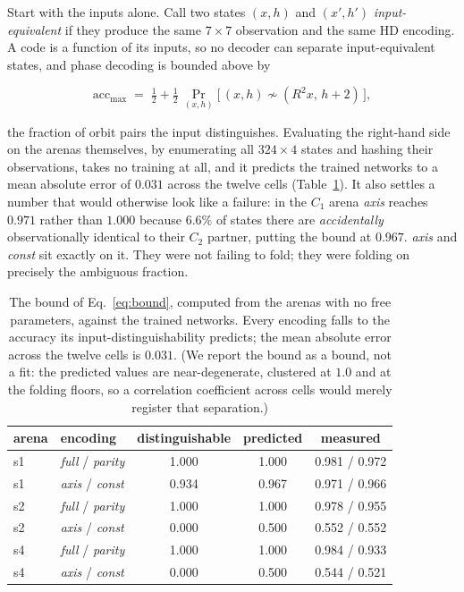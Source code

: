 Start with the inputs alone. Call two states $(x,h)$ and $(x',h')$ \emph{input-equivalent} if they
produce the same $7\times7$ observation and the same HD encoding. A code is a function of its inputs, so
no decoder can separate input-equivalent states, and phase decoding is bounded above by

\begin{equation}
\mathrm{acc}_{\max} \;=\; \tfrac12 + \tfrac12 \, \Pr_{(x,h)}\!\big[\,(x,h) \not\sim (R^2x,\, h+2)\,\big],
\label{eq:bound}
\end{equation}

the fraction of orbit pairs the input distinguishes. Evaluating the right-hand side on the arenas
themselves, by enumerating all $324\times4$ states and hashing their observations, takes no training
at all, and it predicts the trained networks to a mean absolute error of $0.031$ across the twelve cells
(Table~\ref{tab:bound}). It also settles a number that would otherwise look like a failure: in the $C_1$
arena \textit{axis} reaches $0.971$ rather than $1.000$ because $6.6\%$ of states there are
\emph{accidentally} observationally identical to their $C_2$ partner, putting the bound at $0.967$.
\textit{axis} and \textit{const} sit exactly on it. They were not failing to fold; they were folding on
precisely the ambiguous fraction.

\begin{table}[t]
\centering
\caption{The bound of Eq.~\ref{eq:bound}, computed from the arenas with no free parameters,
against the trained networks. Every encoding falls to the accuracy its input-distinguishability
predicts; the mean absolute error across the twelve cells is $0.031$. (We report the bound as a
bound, not a fit: the predicted values are near-degenerate, clustered at $1.0$ and at the
folding floors, so a correlation coefficient across cells would merely register that
separation.)}
\label{tab:bound}
\begin{tabular}{llccc}
\toprule
arena & encoding & distinguishable & predicted & measured \\
\midrule
s1 & \textit{full} / \textit{parity} & 1.000 & 1.000 & 0.981 / 0.972 \\
s1 & \textit{axis} / \textit{const}  & 0.934 & 0.967 & 0.971 / 0.966 \\
s2 & \textit{full} / \textit{parity} & 1.000 & 1.000 & 0.978 / 0.955 \\
s2 & \textit{axis} / \textit{const}  & 0.000 & 0.500 & 0.552 / 0.552 \\
s4 & \textit{full} / \textit{parity} & 1.000 & 1.000 & 0.984 / 0.933 \\
s4 & \textit{axis} / \textit{const}  & 0.000 & 0.500 & 0.544 / 0.521 \\
\bottomrule
\end{tabular}
\end{table}

